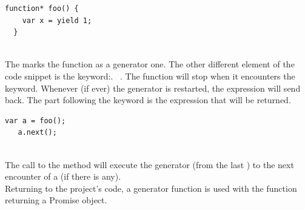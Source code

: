 \documentclass[11pt, a4paper, twoside, openright, openany]{book} %
\begin{document}
\begin{lstlisting}[caption={Structure of a generator function}, captionpos=b]
  function* foo() {
    var x = yield 1;
  }
  \end{lstlisting}
\leavevmode \\
The \say{*} marks the function as a generator one. The other different element of
the code snippet is the keyword:. 
~\cite{yieldExpression}. The function will stop when it encounters the  keyword.
Whenever (if ever) the generator is restarted, the  expression will send  back.
The part following the  keyword is the expression that will be returned.\\

 \begin{lstlisting}[caption={Restart of a generator function}, captionpos=b]
   var a = foo();
   a.next();
 \end{lstlisting}
 \leavevmode \\
The call to the  method will execute the generator (from the last ) to the next encounter of a  (if there is any).\\
Returning to the project's code, a generator function is used with the function returning a Promise object.\\
\end{document}
